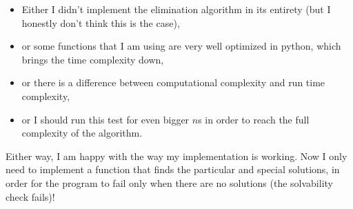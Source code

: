 \documentclass[]{article}
\begin{document}
\begin{itemize}
\item Either I didn't implement the elimination algorithm in its entirety (but I honestly don't think this is the case),
\item or some functions that I am using are very well optimized in python, which brings the time complexity down,
\item or there is a difference between computational complexity and run time complexity,
\item or I should run this test for even bigger $n$s in order to reach the full complexity of the algorithm.
\end{itemize}

Either way, I am happy with the way my implementation is working. Now I only need to implement a function that finds the particular and special solutions, in order for the program to fail only when there are no solutions (the solvability check fails)!
\end{document}
